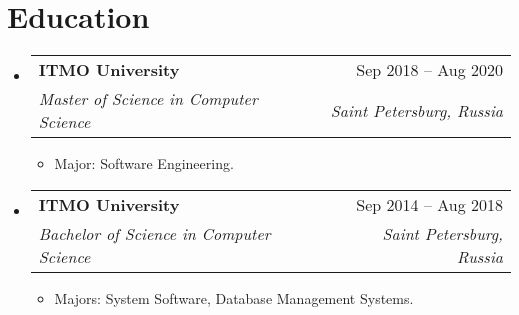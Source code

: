 \documentclass[a4paper,10pt]{article}
\makeatletter
\newcommand{\resumeItem}[1]{
  \item\small{#1}
}
\newcommand{\resumeItemListStart}{\begin{itemize}[rightmargin=0.11in]}
\newcommand{\resumeItemListEnd}{\end{itemize}}
\newcommand{\resumeTrioHeading}[3]{
  \item\small{
    \begin{tabular*}{0.96\textwidth}[t]{
      l@{\extracolsep{\fill}}c@{\extracolsep{\fill}}r
    }
      \textbf{#1} & \textit{#2} & #3
    \end{tabular*}
  }
}
\newcommand{\resumeQuadHeading}[4]{
  \item
  \begin{tabular*}{0.96\textwidth}[t]{l@{\extracolsep{\fill}}r}
    \textbf{#1} & #2 \\
    \textit{\small#3} & \textit{\small #4} \\
  \end{tabular*}
}
\newcommand{\resumeHeadingListStart}{
  \begin{itemize}[leftmargin=0.15in, label={}]
}
\newcommand{\resumeHeadingListEnd}{\end{itemize}}
\newcommand{\hrefUline}[2]{
  \href{#1}{\uline{#2}}
}
\makeatother
\begin{document}
\section{Education}
  \resumeHeadingListStart{}
    \resumeQuadHeading{ITMO University}{Sep 2018 -- Aug 2020}
    {Master of Science in Computer Science}{Saint Petersburg, Russia}
      \resumeItemListStart{}
        \resumeItem{Major: Software Engineering.}
      \resumeItemListEnd{}

    \resumeQuadHeading{ITMO University}{Sep 2014 -- Aug 2018}
    {Bachelor of Science in Computer Science}{Saint Petersburg, Russia}
      \resumeItemListStart{}
        \resumeItem{Majors: System Software, Database Management Systems.}
      \resumeItemListEnd{}
  \resumeHeadingListEnd{}






\end{document}
